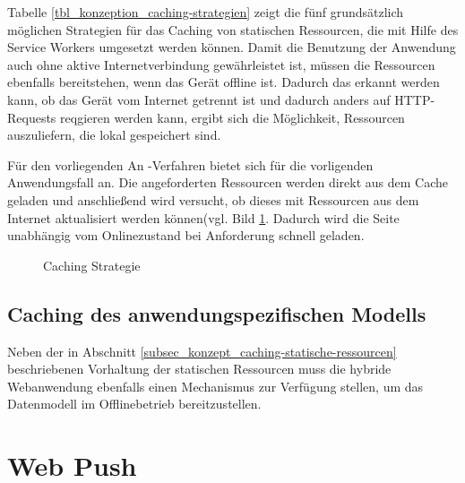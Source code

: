 Tabelle \ref{tbl_konzeption_caching-strategien} zeigt die fünf grundsätzlich möglichen Strategien für das Caching von statischen Ressourcen, die mit Hilfe des Service Workers umgesetzt werden können. Damit die Benutzung der Anwendung auch ohne aktive Internetverbindung gewährleistet ist, müssen die Ressourcen ebenfalls bereitstehen, wenn das Gerät offline ist. Dadurch das erkannt werden kann, ob das Gerät vom Internet getrennt ist und dadurch anders auf HTTP-Requests reqgieren werden kann, ergibt sich die Möglichkeit, Ressourcen auszuliefern, die lokal gespeichert sind.

Für den vorliegenden An -Verfahren bietet sich für die vorligenden Anwendungsfall an. Die angeforderten Ressourcen werden direkt aus dem Cache geladen und anschließend wird versucht, ob dieses mit Ressourcen aus dem Internet aktualisiert werden können(vgl. Bild \ref{image_konzept_caching-strategie}. Dadurch wird die Seite unabhängig vom Onlinezustand bei Anforderung schnell geladen.

\begin{figure}[htp] 
\caption{Caching Strategie}
\label{image_konzept_caching-strategie}
\end{figure} 

\subsection{Caching des anwendungspezifischen Modells}
\label{subsec_konzeption_caching-modell}

Neben der in Abschnitt \ref{subsec_konzept_caching-statische-ressourcen} beschriebenen Vorhaltung der statischen Ressourcen muss die hybride Webanwendung ebenfalls einen Mechanismus zur Verfügung stellen, um das Datenmodell im Offlinebetrieb bereitzustellen.

\newpage
\section{Web Push}
\label{subsubsec_konzeption_serviceworker_push-api}

